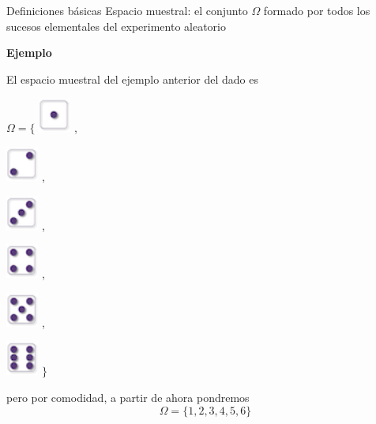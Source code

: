 \documentclass[
  ignorenonframetext,
]{beamer}
\begin{document}
\begin{frame}{Definiciones básicas}
\protect\hypertarget{definiciones-buxe1sicas-1}{}
Espacio muestral: el conjunto \(\Omega\) formado por todos los sucesos
elementales del experimento aleatorio

\textbf{Ejemplo}

El espacio muestral del ejemplo anterior del dado es

\(\Omega=\Big\{\)
\includegraphics[width=0.42in]{Images/proba1dibujos/dice/1} ,

\includegraphics[width=0.42in]{Images/proba1dibujos/dice/2} ,

\includegraphics[width=0.42in]{Images/proba1dibujos/dice/3} ,

\includegraphics[width=0.42in]{Images/proba1dibujos/dice/4} ,

\includegraphics[width=0.42in]{Images/proba1dibujos/dice/5} ,

\includegraphics[width=0.42in]{Images/proba1dibujos/dice/6} \(\Big\}\)

pero por comodidad, a partir de ahora pondremos
\[\Omega = \{1,2,3,4,5,6\}\]
\end{frame}
\end{document}
